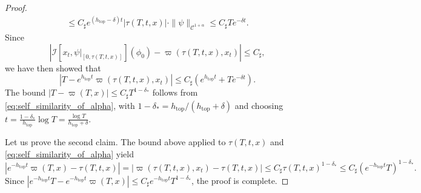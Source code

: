 \documentclass[11pt,letterpaper]{amsart}
\newcommand \sC {{C_\sharp}}
\DeclareMathOperator{\topp}{top}
\theoremstyle{definition}
\begin{document}
\begin{proof}
\begin{multline*}
\leq \sC e^{(h_{\topp}-\delta) t} |\tau(T,t,x)| \cdot \|\psi\|_{\mathscr{C}^{1+\alpha}}\leq \sC T e^{-\delta t}.
\end{multline*}
Since 
\[
\left\lvert   \mathcal{I}[x_{t},\psi|_{[0,\tau(T,t,x)]}](\phi_0)   - \varpi(\tau(T,t,x),x_t)\right\rvert\leq \sC,
\]
we have then showed that 
\[
\left\lvert T - e^{h_{\topp}t} \varpi(\tau(T,t,x),x_t) \right\rvert \leq \sC (e^{h_{\topp}t} +T e^{-\delta t}).
\]
The bound $\left\lvert T- \varpi(T,x)\right\rvert  \leq \sC T^{1-\delta_{\ast}}$ follows from \eqref{eq:self_similarity_of_alpha}, with $1-\delta_{\ast} =h_{\topp}/(h_{\topp}+\delta)$ and choosing $t=\frac{1-\delta_{\ast}}{h_{\topp}} \log T =  \frac{\log T}{h_{\topp} + \delta}$.

Let us prove the second claim. The bound above applied to $\tau(T,t,x)$ and \eqref{eq:self_similarity_of_alpha} yield
\[
\left\lvert e^{-h_{\topp}t} \varpi(T,x) - \tau(T,t,x)\right\rvert =\left\lvert  \varpi(\tau(T,t,x),x_t) - \tau(T,t,x)\right\rvert
 \leq \sC \tau(T,t,x)^{1-\delta_{\ast}} \leq \sC (e^{-h_{\topp}t}T)^{1-\delta_{\ast}}.
\]
Since $\left\lvert e^{-h_{\topp}t}T- e^{-h_{\topp}t}\varpi(T,x)\right\rvert  \leq \sC e^{-h_{\topp}t}T^{1-\delta_{\ast}}$, the proof is complete.
\end{proof}



\end{document}
